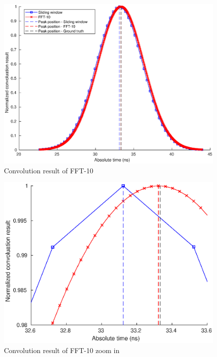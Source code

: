 \begin{figure}[t!p]
\centering
\includegraphics[width=1\textwidth]{figures/chapter_ADC_MF/plot_convRes_FFT10_sim.eps}
\caption{Convolution result of FFT-10}
\label{fig:NP_sig_FFT10}
\end{figure}
%
\begin{figure}[t!p]
\centering
\includegraphics[width=1\textwidth]{figures/chapter_ADC_MF/plot_convRes_FFT10_zoomin.eps}
\caption{Convolution result of FFT-10 zoom in}
\end{figure}
